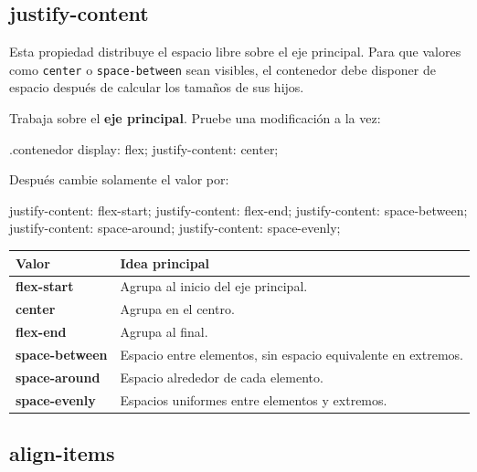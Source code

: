 \documentclass[11pt]{article}
\begin{document}
    \subsection{justify-content}

    Esta propiedad distribuye el espacio libre sobre el eje principal. Para que valores como \texttt{center} o \texttt{space-between} sean visibles, el contenedor debe disponer de espacio después de calcular los tamaños de sus hijos.

    Trabaja sobre el \textbf{eje principal}. Pruebe una modificación a la vez:

    \begin{csscodedark}
        .contenedor {
            display: flex;
            justify-content: center;
        }
    \end{csscodedark}

    Después cambie solamente el valor por:

    \begin{csscodedark}
        justify-content: flex-start;
        justify-content: flex-end;
        justify-content: space-between;
        justify-content: space-around;
        justify-content: space-evenly;
    \end{csscodedark}

    \begin{center}
        \begin{tabularx}{0.92\textwidth}{>{\bfseries}p{3.4cm}X}
            \toprule
            Valor & Idea principal \\
            \midrule
            flex-start & Agrupa al inicio del eje principal. \\
            center & Agrupa en el centro. \\
            flex-end & Agrupa al final. \\
            space-between & Espacio entre elementos, sin espacio equivalente en extremos. \\
            space-around & Espacio alrededor de cada elemento. \\
            space-evenly & Espacios uniformes entre elementos y extremos. \\
            \bottomrule
        \end{tabularx}
    \end{center}

    \subsection{align-items}
\end{document}
